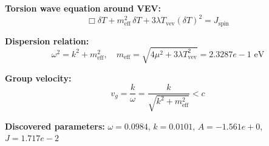 
\textbf{Torsion wave equation around VEV:}
\begin{equation}
  \Box \delta T + m_{\text{eff}}^2 \, \delta T + 3\lambda T_{\text{vev}} (\delta T)^2 = J_{\text{spin}}
\end{equation}

\textbf{Dispersion relation:}
\begin{equation}
  \omega^2 = k^2 + m_{\text{eff}}^2, \quad
  m_{\text{eff}} = \sqrt{4\mu^2 + 3\lambda T_{\text{vev}}^2} = 2.3287e-1 \text{ eV}
\end{equation}

\textbf{Group velocity:}
\begin{equation}
  v_g = \frac{k}{\omega} = \frac{k}{\sqrt{k^2 + m_{\text{eff}}^2}} < c
\end{equation}

\textbf{Discovered parameters:}
$\omega = 0.0984$, \quad
$k = 0.0101$, \quad
$A = -1.561e+0$, \quad
$J = 1.717e-2$